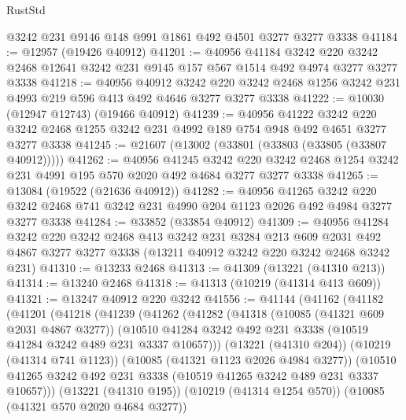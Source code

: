 \begin{lexlean}{RustStd}
\begin{coremodule}
    @3242
    @231
    @9146
    @148
    @991
    @1861
    @492
    @4501
    @3277
    @3277
    @3338
@41184 := @12957 (@19426 @40912)
@41201 := @40956
    @41184
    @3242
    @220
    @3242
    @2468
    @12641
    @3242
    @231
    @9145
    @157
    @567
    @1514
    @492
    @4974
    @3277
    @3277
    @3338
@41218 := @40956
    @40912
    @3242
    @220
    @3242
    @2468
    @1256
    @3242
    @231
    @4993
    @219
    @596
    @413
    @492
    @4646
    @3277
    @3277
    @3338
@41222 := @10030 (@12947 @12743) (@19466 @40912)
@41239 := @40956
    @41222
    @3242
    @220
    @3242
    @2468
    @1255
    @3242
    @231
    @4992
    @189
    @754
    @948
    @492
    @4651
    @3277
    @3277
    @3338
@41245 := @21607 (@13002 (@33801 (@33803 (@33805 (@33807 @40912)))))
@41262 := @40956
    @41245
    @3242
    @220
    @3242
    @2468
    @1254
    @3242
    @231
    @4991
    @195
    @570
    @2020
    @492
    @4684
    @3277
    @3277
    @3338
@41265 := @13084 (@19522 (@21636 @40912))
@41282 := @40956
    @41265
    @3242
    @220
    @3242
    @2468
    @741
    @3242
    @231
    @4990
    @204
    @1123
    @2026
    @492
    @4984
    @3277
    @3277
    @3338
@41284 := @33852 (@33854 @40912)
@41309 := @40956
    @41284
    @3242
    @220
    @3242
    @2468
    @413
    @3242
    @231
    @3284
    @213
    @609
    @2031
    @492
    @4867
    @3277
    @3277
    @3338
    (@13211 @40912 @3242 @220 @3242 @2468 @3242 @231)
@41310 := @13233 @2468
@41313 := @41309 (@13221 (@41310 @213))
@41314 := @13240 @2468
@41318 := @41313 (@10219 (@41314 @413 @609))
@41321 := @13247 @40912 @220 @3242
@41556 := @41144
    (@41162
      (@41182
        (@41201
          (@41218
            (@41239
              (@41262
                (@41282
                  (@41318
                    (@10085 (@41321 @609 @2031 @4867 @3277))
                    (@10510
                      @41284
                      @3242
                      @492
                      @231
                      @3338
                      (@10519 @41284 @3242 @489 @231 @3337 @10657)))
                  (@13221 (@41310 @204))
                  (@10219 (@41314 @741 @1123))
                  (@10085 (@41321 @1123 @2026 @4984 @3277))
                  (@10510
                    @41265
                    @3242
                    @492
                    @231
                    @3338
                    (@10519 @41265 @3242 @489 @231 @3337 @10657)))
                (@13221 (@41310 @195))
                (@10219 (@41314 @1254 @570))
                (@10085 (@41321 @570 @2020 @4684 @3277))

\end{coremodule}
\end{lexlean}
